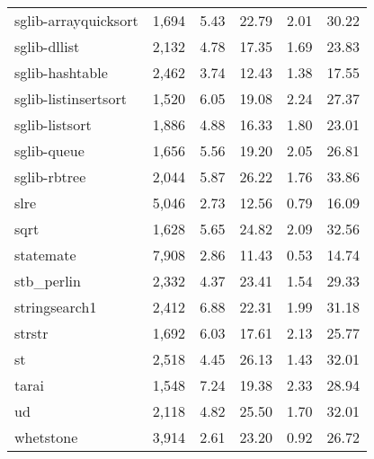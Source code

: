\begin{table}[ptb]
{\begin{tabular}{@{}lrrrrr@{}}
sglib-arrayquicksort & 1,694 & 5.43 & 22.79 & 2.01 & 30.22 \\
sglib-dllist & 2,132 & 4.78 & 17.35 & 1.69 & 23.83 \\
sglib-hashtable & 2,462 & 3.74 & 12.43 & 1.38 & 17.55 \\
sglib-listinsertsort & 1,520 & 6.05 & 19.08 & 2.24 & 27.37 \\
sglib-listsort & 1,886 & 4.88 & 16.33 & 1.80 & 23.01 \\
sglib-queue & 1,656 & 5.56 & 19.20 & 2.05 & 26.81 \\
sglib-rbtree & 2,044 & 5.87 & 26.22 & 1.76 & 33.86 \\
slre & 5,046 & 2.73 & 12.56 & 0.79 & 16.09 \\
sqrt & 1,628 & 5.65 & 24.82 & 2.09 & 32.56 \\
statemate & 7,908 & 2.86 & 11.43 & 0.53 & 14.74 \\
stb\_perlin & 2,332 & 4.37 & 23.41 & 1.54 & 29.33 \\
stringsearch1 & 2,412 & 6.88 & 22.31 & 1.99 & 31.18 \\
strstr & 1,692 & 6.03 & 17.61 & 2.13 & 25.77 \\
st & 2,518 & 4.45 & 26.13 & 1.43 & 32.01 \\
tarai & 1,548 & 7.24 & 19.38 & 2.33 & 28.94 \\
ud & 2,118 & 4.82 & 25.50 & 1.70 & 32.01 \\
whetstone & 3,914 & 2.61 & 23.20 & 0.92 & 26.72 \\
\bottomrule
\end{tabular}
}
\label{table:codesize}
\end{table}
